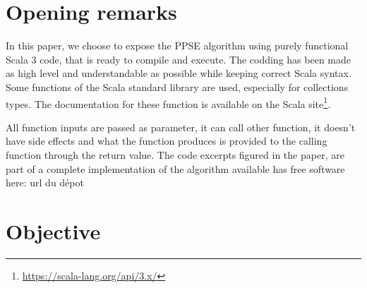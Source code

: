 \documentclass[10pt,a4paper]{article}
\theoremstyle{definition}
\theoremstyle{remark}
\begin{document}
%
%
%

\section{Opening remarks}

In this paper, we choose to expose the PPSE algorithm using purely functional Scala 3 code, that is ready to compile and execute. The codding has been made as high level and understandable as possible while keeping correct Scala syntax. Some functions of the Scala standard library are used, especially for collections types. The documentation for these function is available on the Scala site\footnote{\url{https://scala-lang.org/api/3.x/}}.

 All function inputs are passed as parameter, it can call other function, it doesn't have side effects and what the function produces is provided to the calling function through the return value. The code excerpts figured in the paper, are part of a complete implementation of the algorithm available has free software here: {\color{red} url du dépot} 


\section{Objective}\label{sec. objective}
\end{document}
